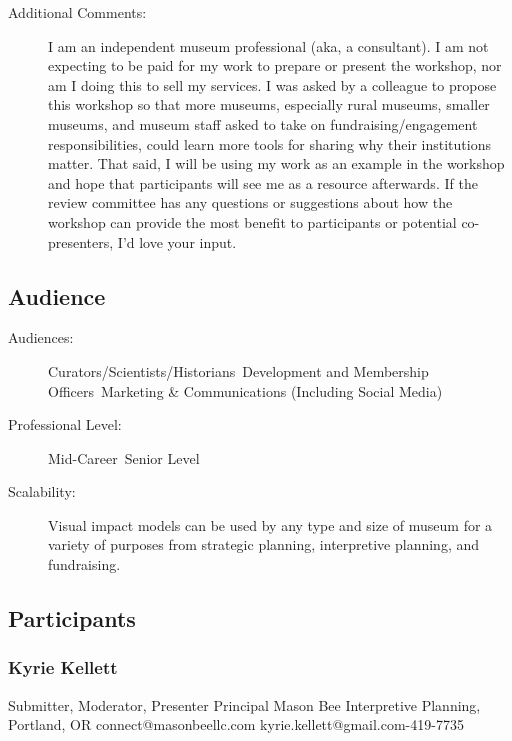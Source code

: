 \documentclass{report}
\begin{document}
\begin{description}
                    \item [Additional Comments: ]I am an independent museum professional (aka, a consultant). I am not expecting to be paid for my work to prepare or present the workshop, nor am I doing this to sell my services. I was asked by a colleague to propose this workshop so that more museums, especially rural museums, smaller museums, and museum staff asked to take on fundraising/engagement responsibilities, could learn more tools for sharing why their institutions matter. That said, I will be using my work as an example in the workshop and hope that participants will see me as a resource afterwards. If the review committee has any questions or suggestions about how the workshop can provide the most benefit to participants or potential co-presenters, I’d love your input.

                \end{description}
              \subsection*{Audience}
                \begin{description}
                  \item [Audiences:]Curators/Scientists/Historians~Development and Membership Officers~Marketing \& Communications (Including Social Media)~
                  \item[Professional Level:]Mid-Career~Senior Level~
                \item[Scalability:] Visual impact models can be used by any type and size of museum for a variety of purposes from strategic planning, interpretive planning, and fundraising.

							
              \end{description}
            \subsection*{Participants}
              \subsubsection*{ Kyrie Kellett }
              Submitter, Moderator, Presenter\newline
              Principal\newline
              Mason Bee Interpretive Planning, Portland, OR
              \newline
              connect@masonbeellc.com\newline
              kyrie.kellett@gmail.com-419-7735\newline
\end{document}
